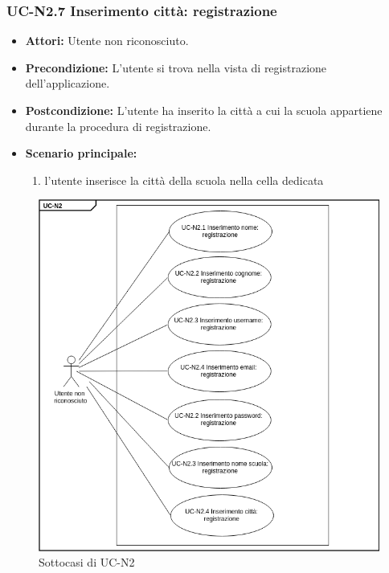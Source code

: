\subsubsection{UC-N2.7 Inserimento città: registrazione}
\begin{itemize}
	\item \textbf{Attori: }Utente non riconosciuto.
	\item \textbf{Precondizione: }L'utente si trova nella vista 		di registrazione dell'applicazione.
	\item \textbf{Postcondizione: }L'utente ha inserito la città a cui la scuola appartiene durante la procedura di registrazione.
	\item \textbf{Scenario principale: }
	\begin{enumerate}
		\item l'utente inserisce la città della scuola nella cella dedicata
	\end{enumerate}
\end{itemize}

\begin{figure}[htbp]
	\centering
	\includegraphics[scale=0.7]{images/UC-N2sub.png}
	\caption{Sottocasi di UC-N2}
\end{figure}


